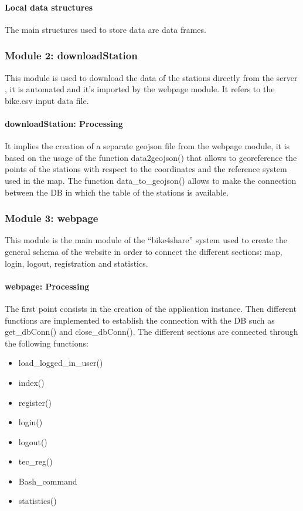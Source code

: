 \documentclass{article}
\begin{document}
\paragraph{Local data structures}
The main structures used to store data are data frames.

\subsubsection{Module 2: downloadStation}
This module is used to download the data of the stations directly from the server , it is automated and it’s imported by the webpage module. It refers to the bike.csv input data file.
\paragraph{downloadStation: Processing}
It implies the creation of  a separate geojson file from the webpage module, it is based on the usage of the function data2geojson()  that allows to georeference the points of the stations with respect to the coordinates and the reference system used in the map. The function data\_to\_geojson() allows to make the connection between the DB in which the table of the stations is available.

\subsubsection{Module 3: webpage}
This module is the main module of the “bike4share” system used to create the general schema of the website in order to connect the different sections: map, login, logout, registration and statistics.
\paragraph{webpage: Processing}
The first point consists in the creation of the application instance. Then different functions are implemented to establish the connection with the DB such as get\_dbConn() and close\_dbConn(). The different sections are connected through the following functions:
\begin{itemize}
    \item load\_logged\_in\_user()
    \item index()
    \item register()
    \item login()
    \item logout()
    \item tec\_reg()
    \item Bash\_command
    \item statistics()
\end{itemize}
\end{document}
